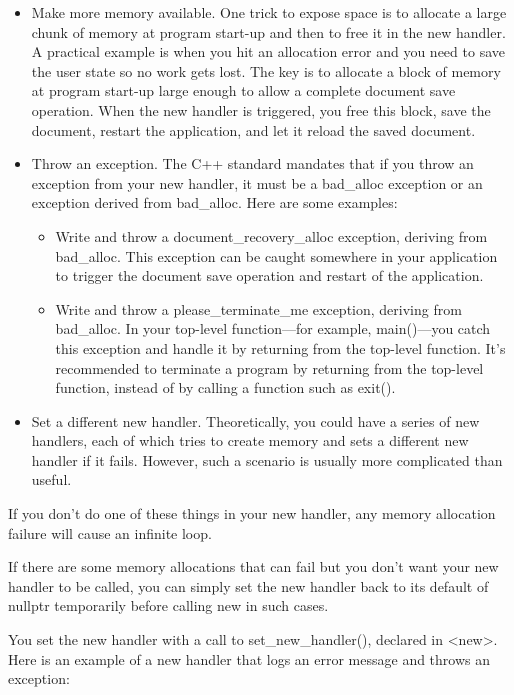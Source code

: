\begin{itemize}
\item
Make more memory available. One trick to expose space is to allocate a large chunk of memory at program start-up and then to free it in the new handler. A practical example is when you hit an allocation error and you need to save the user state so no work gets lost. The key is to allocate a block of memory at program start-up large enough to allow a complete document save operation. When the new handler is triggered, you free this block, save the document, restart the application, and let it reload the saved document.

\item
Throw an exception. The C++ standard mandates that if you throw an exception from your new handler, it must be a bad\_alloc exception or an exception derived from bad\_alloc. Here are some examples:
\begin{itemize}
\item
Write and throw a document\_recovery\_alloc exception, deriving from bad\_alloc. This exception can be caught somewhere in your application to trigger the document save operation and restart of the application.

\item
Write and throw a please\_terminate\_me exception, deriving from bad\_alloc. In your top-level function—for example, main()—you catch this exception and handle it by returning from the top-level function. It’s recommended to terminate a program by returning from the top-level function, instead of by calling a function such as exit().
\end{itemize}

\item
Set a different new handler. Theoretically, you could have a series of new handlers, each of which tries to create memory and sets a different new handler if it fails. However, such a scenario is usually more complicated than useful.
\end{itemize}

If you don’t do one of these things in your new handler, any memory allocation failure will cause an infinite loop.

If there are some memory allocations that can fail but you don’t want your new handler to be called, you can simply set the new handler back to its default of nullptr temporarily before calling new in such cases.

You set the new handler with a call to set\_new\_handler(), declared in <new>. Here is an example of a new handler that logs an error message and throws an exception:

